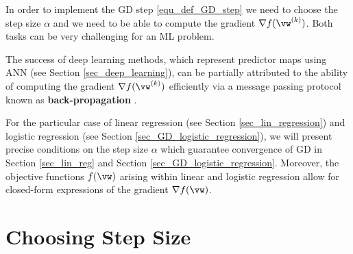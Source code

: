 \documentclass[12pt]{report}
\begin{document}
In order to implement the GD step \eqref{equ_def_GD_step} we need 
to choose the step size $\alpha$ and we need to be able to compute 
the gradient $\nabla f(\vw^{(k)})$. Both tasks can be very challenging 
for an ML problem. 

The success of deep learning methods, which represent predictor maps 
using ANN (see Section \ref{sec_deep_learning}), can be partially attributed to 
the ability of computing the gradient $\nabla f(\vw^{(k)})$ efficiently 
via a message passing protocol known as {\bf back-propagation} \cite{Goodfellow-et-al-2016}. 

For the particular case of linear regression (see Section \ref{sec_lin_regression}) 
and logistic regression (see Section \ref{sec_GD_logistic_regression}), we 
will present precise conditions on the step size $\alpha$ which guarantee 
convergence of GD in Section \ref{sec_lin_reg} and Section \ref{sec_GD_logistic_regression}. 
Moreover, the objective functions $f(\vw)$ arising within linear and logistic 
regression allow for closed-form expressions of the gradient $\nabla f(\vw)$.

\section{Choosing Step Size} 
\end{document}
